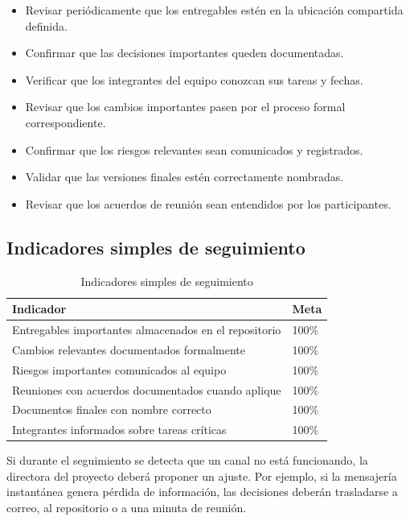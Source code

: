 \documentclass[11pt,spanish]{article}
\begin{document}
\begin{itemize}
    \item Revisar periódicamente que los entregables estén en la ubicación compartida definida.
    \item Confirmar que las decisiones importantes queden documentadas.
    \item Verificar que los integrantes del equipo conozcan sus tareas y fechas.
    \item Revisar que los cambios importantes pasen por el proceso formal correspondiente.
    \item Confirmar que los riesgos relevantes sean comunicados y registrados.
    \item Validar que las versiones finales estén correctamente nombradas.
    \item Revisar que los acuerdos de reunión sean entendidos por los participantes.
\end{itemize}

\subsection{Indicadores simples de seguimiento}

\begin{table}[H]
\centering
\caption{Indicadores simples de seguimiento}
\label{tab:indicadores-seguimiento}
\begin{tabularx}{\textwidth}{Y p{3cm}}
\toprule
\textbf{Indicador} & \textbf{Meta} \\
\midrule
Entregables importantes almacenados en el repositorio & 100\% \\
Cambios relevantes documentados formalmente & 100\% \\
Riesgos importantes comunicados al equipo & 100\% \\
Reuniones con acuerdos documentados cuando aplique & 100\% \\
Documentos finales con nombre correcto & 100\% \\
Integrantes informados sobre tareas críticas & 100\% \\
\bottomrule
\end{tabularx}
\end{table}

Si durante el seguimiento se detecta que un canal no está funcionando, la directora del proyecto deberá proponer un ajuste. Por ejemplo, si la mensajería instantánea genera pérdida de información, las decisiones deberán trasladarse a correo, al repositorio o a una minuta de reunión.
\end{document}

